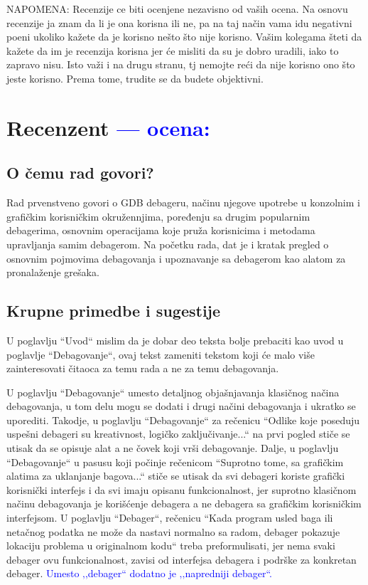 \documentclass[a4paper]{report}
\newcommand{\odgovor}[1]{\textcolor{blue}{#1}}
\begin{document}
NAPOMENA: Recenzije ce biti ocenjene nezavisno od vaših ocena. Na osnovu recenzije ja znam da li je ona korisna ili ne, pa na taj način vama idu negativni poeni ukoliko kažete da je korisno nešto što nije korisno. Vašim kolegama šteti da kažete da im je recenzija korisna jer će misliti da su je dobro uradili, iako to zapravo nisu. Isto važi i na drugu stranu, tj nemojte reći da nije korisno ono što jeste korisno. Prema tome, trudite se da budete objektivni. 
\chapter{Recenzent \odgovor{--- ocena:} }


\section{O čemu rad govori?}
Rad prvenstveno govori o GDB debageru, načinu njegove upotrebe u konzolnim i grafičkim korisničkim okružennjima, poređenju sa drugim popularnim debagerima, osnovnim operacijama koje pruža korisnicima i metodama upravljanja samim debagerom. Na početku rada, dat je i kratak pregled o osnovnim pojmovima debagovanja i upoznavanje sa debagerom kao alatom za pronalaženje grešaka.

\section{Krupne primedbe i sugestije}
U poglavlju ``Uvod`` mislim da je dobar deo teksta bolje prebaciti kao uvod u poglavlje ``Debagovanje``, ovaj tekst zameniti tekstom koji će malo više zainteresovati čitaoca za temu rada a ne za temu debagovanja. 

U poglavlju  ``Debagovanje`` umesto detaljnog objašnjavanja klasičnog načina debagovanja, u tom delu mogu se dodati i drugi načini debagovanja i ukratko se uporediti. Takodje, u poglavlju ``Debagovanje`` za rečenicu ``Odlike koje poseduju uspešni debageri su kreativnost, logičko zaključivanje...`` na prvi pogled stiče se utisak da se opisuje alat a ne čovek koji vrši debagovanje. Dalje, u poglavlju ``Debagovanje`` u pasusu koji počinje rečenicom ``Suprotno tome, sa grafičkim alatima za uklanjanje bagova...`` stiče se utisak da svi debageri koriste grafički korisnički interfejs i da svi imaju opisanu funkcionalnost, jer suprotno klasičnom načinu debagovanja je korišćenje debagera a ne debagera sa grafičkim korisničkim interfejsom. U poglavlju ``Debager``, rečenicu ``Kada program usled baga ili netačnog podatka ne može da nastavi normalno sa radom, debager pokazuje lokaciju problema u originalnom kodu`` treba preformulisati, jer nema svaki debager ovu funkcionalnost, zavisi od interfejsa debagera i podrške za konkretan debager.
\odgovor{Umesto ‚‚debager`` dodatno je ‚‚napredniji debager``.}
\end{document}
